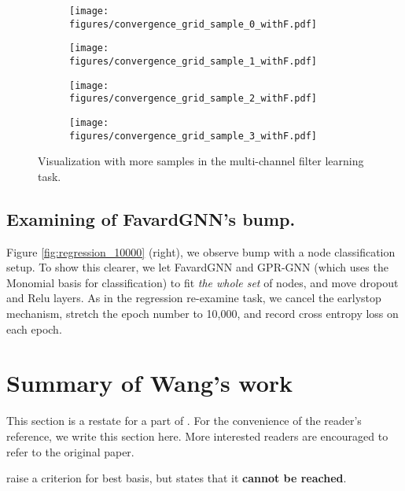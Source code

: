  \begin{figure}[htp]
  \begin{subfigure}{0.5\textwidth}
    \centering
    \texttt{[image: figures/convergence\_grid\_sample\_0\_withF.pdf]}  
  \end{subfigure}
  \begin{subfigure}{0.5\textwidth}
    \centering
    \texttt{[image: figures/convergence\_grid\_sample\_1\_withF.pdf]}  
  \end{subfigure}
  \begin{subfigure}{0.5\textwidth}
    \centering
    \texttt{[image: figures/convergence\_grid\_sample\_2\_withF.pdf]}  
  \end{subfigure}
    \begin{subfigure}{0.5\textwidth}
    \centering
    \texttt{[image: figures/convergence\_grid\_sample\_3\_withF.pdf]}  
  \end{subfigure}
  \caption{Visualization with more samples in the multi-channel filter learning task.
  }
  \label{fig:more-samples}
  \end{figure}


\subsection{Examining of FavardGNN's bump.}
\label{expappendix:bump}
Figure \ref{fig:regression_10000} (right), 
we observe bump with a node classification setup. 
To show this clearer, we let FavardGNN and GPR-GNN (which uses the Monomial basis for classification) to fit \textit{the whole set} of nodes, and move \textrm{dropout} and \textrm{Relu} layers. 
As in the regression re-examine task, 
we cancel the earlystop mechanism,
stretch the epoch number to 10,000, 
and record cross entropy loss on each epoch.  



\section{Summary of Wang's work}
\label{sec:SumWang}

This section is a restate for a part of \citet{Wang2022jacobi}. 
For the convenience of the reader's reference, 
we write this section here. 
More interested readers are encouraged to refer to the original paper.

\citet{Wang2022jacobi} raise a criterion for best basis, but states that it
{\textbf{cannot be reached}}.



